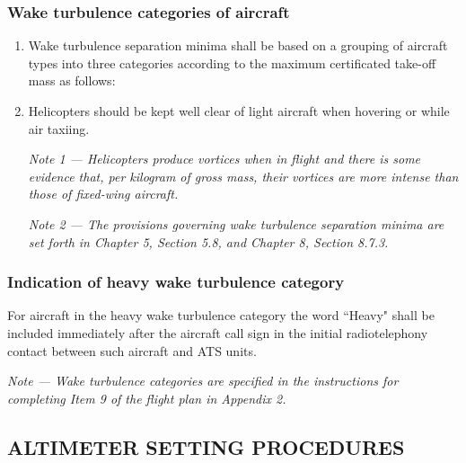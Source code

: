 \documentclass[../main.tex]{subfiles}
\begin{document}
    \subsubsection{Wake turbulence categories of aircraft}

    \begin{enumerate}
        \item Wake turbulence separation minima shall be based on a grouping of aircraft types into three categories according to the maximum certificated take-off mass as follows:


        \item Helicopters should be kept well clear of light aircraft when hovering or while air taxiing.

        \textit{Note 1 --- Helicopters produce vortices when in flight and there is some evidence that, per kilogram of gross mass, their vortices are more intense than those of fixed-wing aircraft.}

        \textit{Note 2 --- The provisions governing wake turbulence separation minima are set forth in Chapter 5, Section 5.8, and Chapter 8, Section 8.7.3.}
    \end{enumerate}

    \subsubsection{Indication of heavy wake turbulence category}

    For aircraft in the heavy wake turbulence category the word ``Heavy" shall be included immediately after the aircraft call sign in the initial radiotelephony contact between such aircraft and ATS units.

    \textit{Note --- Wake turbulence categories are specified in the instructions for completing Item 9 of the flight plan in Appendix 2.}

    \subsection[Altimeter setting procedures]{ALTIMETER SETTING PROCEDURES}
\end{document}
